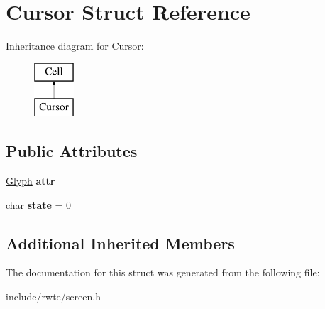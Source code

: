 \hypertarget{structCursor}{}\section{Cursor Struct Reference}
\label{structCursor}
Inheritance diagram for Cursor\+:\begin{figure}[H]
\begin{center}
\leavevmode
\includegraphics[height=2.000000cm]{structCursor}
\end{center}
\end{figure}
\subsection*{Public Attributes}
\begin{DoxyCompactItemize}
\item 
\mbox{\label{structCursor_a671fd18c42319d1d07837632fc4d9d20}} 
\mbox{\hyperlink{structGlyph}{Glyph}} {\bfseries attr}
\item 
\mbox{\label{structCursor_a1f67a6598dd2f0bf889202190dc399dd}} 
char {\bfseries state} = 0
\end{DoxyCompactItemize}
\subsection*{Additional Inherited Members}


The documentation for this struct was generated from the following file\+:\begin{DoxyCompactItemize}
\item 
include/rwte/screen.\+h\end{DoxyCompactItemize}
